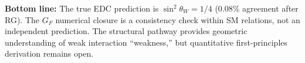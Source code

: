 \textbf{Bottom line:} The true EDC prediction is $\sin^2\theta_W = 1/4$ (0.08\%
agreement after RG). The $G_F$ numerical closure is a consistency check within
SM relations, not an independent prediction. The structural pathway provides
geometric understanding of weak interaction ``weakness,'' but quantitative
first-principles derivation remains open.



